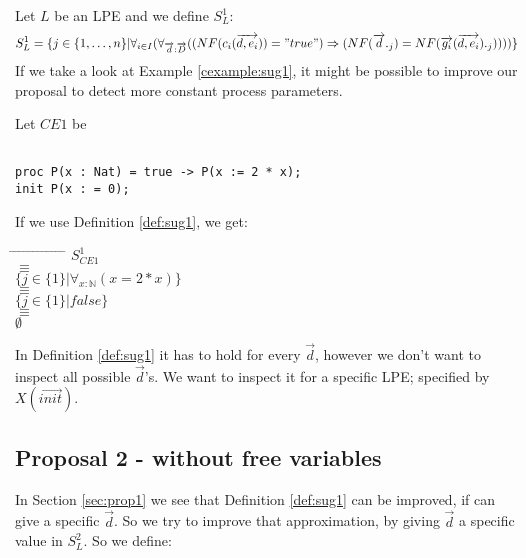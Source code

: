 \index{}\documentclass[a4paper,10pt]{article}
\theoremstyle{plain}
\theoremstyle{definition}
\newcommand{\ovr}{\overrightarrow}
\newcommand{\pps}{process parameters}
\newcommand{\tab}{\hspace*{5.mm} \= \hspace*{5.mm} \= \hspace*{5.mm} \= \hspace*{5.mm} \= \hspace*{5.mm} \= \hspace*{5.mm}  \= \hspace*{5.mm}  \= \hspace*{5.mm}  \= \hspace*{5.mm} \= \hspace*{5.mm} \= \hspace*{5.mm}  \= \hspace*{5.mm}  \= \hspace*{5.mm}\kill}
\begin{document}
\begin{defn} \label{def:sug1} Let $L$ be an LPE and we define $S_L^1$:
\begin{displaymath}
S_L^1 =
\lbrace   
j \in \lbrace 1, \ldots , n \rbrace \vert \forall_{i\in I} (\forall_{\ovr{d}: \ovr{D}}((NF(c_i(\ovr{d,e_i})) = "true")  \Rightarrow (NF(\ovr{d}._j) = NF(\ovr{g_i}(\ovr{d,e_i})._j))))\rbrace
\end{displaymath}
If we take a look at Example \ref{cexample:sug1}, it might be possible to improve our proposal to detect more constant \pps .
\begin{example}Let $CE1$ be \label{cexample:sug1}\begin{verbatim}

proc P(x : Nat) = true -> P(x := 2 * x);
init P(x : = 0);

\end{verbatim}
\end{example}
\begin{flushleft}
If we use Definition \ref{def:sug1}, we get:\\
\end{flushleft}
\begin{tabbing}
\tab
\> \> $S_{CE1}^1$\\
\> $\equiv$\\
\> \> $\lbrace j \in \lbrace 1 \rbrace \vert \forall_{x : \mathbb{N}}( x = 2 \ast x ) \rbrace $\\
\> $\equiv$ \\
\> \> $\lbrace j \in \lbrace 1 \rbrace \vert false \rbrace $\\
\> $\equiv$ \\
\> \> $\emptyset$ \\
\end{tabbing}
In Definition \ref{def:sug1} it has to hold for every $\ovr{d}$, however
we don't want to inspect all possible $\ovr{d}$'s. We want to inspect it for a specific LPE; specified by $X(\ovr{init})$.
\end{defn}

\subsection{Proposal 2 - without free variables}
In Section \ref{sec:prop1} we see that Definition \ref{def:sug1} can be improved, if can give a specific $\ovr{d}$. So we try to improve that approximation, by giving $\ovr{d}$ a specific value in $S_L^2$. So we define: 
\end{document}
